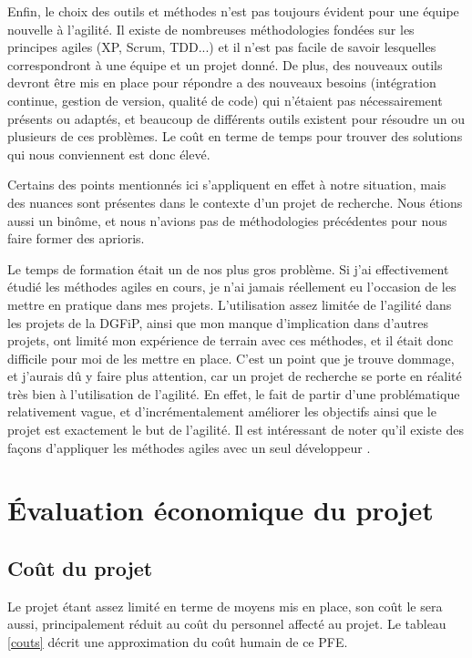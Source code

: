 \documentclass[openany, 11pt]{memoir}
\begin{document}
Enfin, le choix des outils et méthodes n'est pas toujours évident pour une équipe nouvelle à l'agilité. Il existe de nombreuses méthodologies fondées sur les principes agiles (XP, Scrum, TDD...) et il n'est pas facile de savoir lesquelles correspondront à une équipe et un projet donné. De plus, des nouveaux outils devront être mis en place pour répondre a des nouveaux besoins (intégration continue, gestion de version, qualité de code) qui n'étaient pas nécessairement présents ou adaptés, et beaucoup de différents outils existent pour résoudre un ou plusieurs de ces problèmes. Le coût en terme de temps pour trouver des solutions qui nous conviennent est donc élevé.

\bigskip
Certains des points mentionnés ici s'appliquent en effet à notre situation, mais des nuances sont présentes dans le contexte d'un projet de recherche. Nous étions aussi un binôme, et nous n'avions pas de méthodologies précédentes pour nous faire former des aprioris.

Le temps de formation était un de nos plus gros problème. Si j'ai effectivement étudié les méthodes agiles en cours, je n'ai jamais réellement eu l'occasion de les mettre en pratique dans mes projets. L'utilisation assez limitée de l'agilité dans les projets de la \gls{DGFiP}, ainsi que mon manque d'implication dans d'autres projets, ont limité mon expérience de terrain avec ces méthodes, et il était donc difficile pour moi de les mettre en place. C'est un point que je trouve dommage, et j'aurais dû y faire plus attention, car un projet de recherche se porte en réalité très bien à l'utilisation de l'agilité. En effet, le fait de partir d'une problématique relativement vague, et d'incrémentalement améliorer les objectifs ainsi que le projet est exactement le but de l'agilité. Il est intéressant de noter qu'il existe des façons d'appliquer les méthodes agiles avec un seul développeur \cite{agilesolo} \cite{ssdm}.

\newpage
\section{Évaluation économique du projet}

\subsection{Coût du projet}

Le projet étant assez limité en terme de moyens mis en place, son coût le sera aussi, principalement réduit au coût du personnel affecté au projet. Le tableau \ref{couts} décrit une approximation du coût humain de ce PFE.
\end{document}
